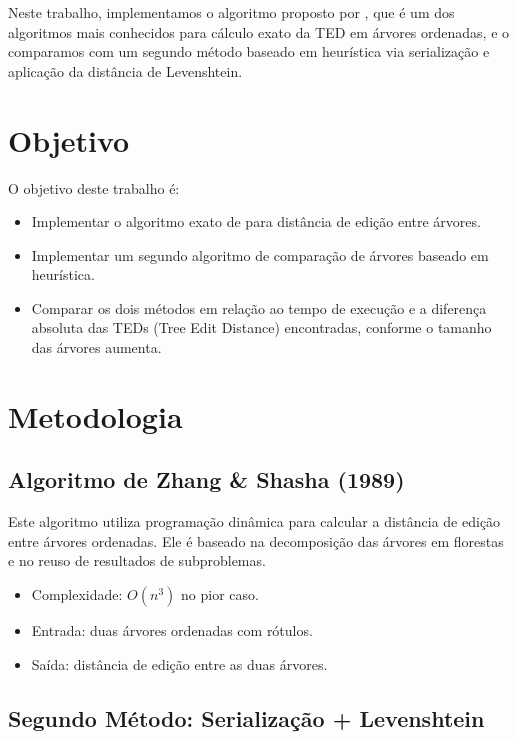 \documentclass{sbc2023}%
\begin{document}
Neste trabalho, implementamos o algoritmo proposto por \cite{doi:10.1137/0218082}, que é um dos algoritmos mais conhecidos para cálculo exato da TED em árvores ordenadas, e o comparamos com um segundo método baseado em heurística via serialização e aplicação da distância de Levenshtein.
\section{Objetivo}

O objetivo deste trabalho é:

\begin{itemize}
\item Implementar o algoritmo exato de \cite{doi:10.1137/0218082} para distância de edição entre árvores.
\item Implementar um segundo algoritmo de comparação de árvores baseado em heurística.
\item Comparar os dois métodos em relação ao tempo de execução e a diferença absoluta das TEDs (Tree Edit Distance) encontradas, conforme o tamanho das árvores aumenta.
\end{itemize}

\section{Metodologia}

\subsection{Algoritmo de Zhang \& Shasha (1989)}

Este algoritmo utiliza programação dinâmica para calcular a distância de edição entre árvores ordenadas. Ele é baseado na decomposição das árvores em florestas e no reuso de resultados de subproblemas.

\begin{itemize}
\item Complexidade: \(O(n^3)\) no pior caso.
\item Entrada: duas árvores ordenadas com rótulos.
\item Saída: distância de edição entre as duas árvores.
\end{itemize}

\subsection{Segundo Método: Serialização + Levenshtein}
\end{document}
